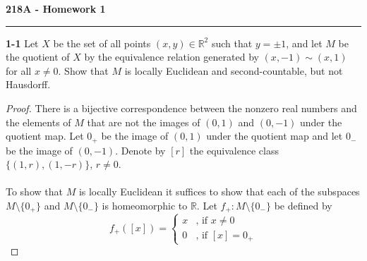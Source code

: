 \documentclass[11pt,letterpaper]{report}
\newcommand{\reals}{\mathbb{R}}
\begin{document}
\begin{center}
{\bf \Large 218A - Homework 1} %
\vspace{0.2cm}
\hrule
\end{center}

\noindent\textbf{1-1}
Let $X$ be the set of all points $(x,y)\in \reals^2$ such that $y = \pm 1$, and let $M$ be the quotient of $X$ by the equivalence relation generated by $(x, -1)\sim (x, 1)$ for all $x\neq 0$. Show that $M$ is locally Euclidean and second-countable, but not Hausdorff.
\begin{proof}
	There is a bijective correspondence between the nonzero real numbers and the elements of $M$ that are not the images of $(0, 1)$ and $(0, -1)$ under the quotient map. Let $0_+$ be the image of $(0, 1)$ under the quotient map and let $0_-$ be the image of $(0, -1)$. Denote by $[r]$ the equivalence class $\{(1, r), (1, -r)\}$, $r\neq 0$.\\\\
	To show that $M$ is locally Euclidean it suffices to show that each of the subspaces $M\setminus \{0_+\}$ and $M\setminus \{0_-\}$ is homeomorphic to $\reals$. Let $f_+: M\setminus \{0_-\}$ be defined by
	\[
	f_+([x]) = \begin{cases}
		x&\text{, if }x\neq 0\\
		0&\text{, if }[x] = 0_+
	\end{cases}
\]
\end{proof}
\end{document}
